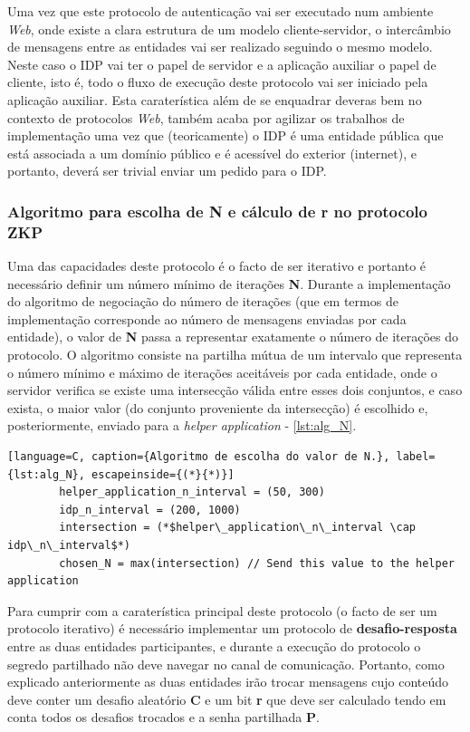 \quad Uma vez que este protocolo de autenticação vai ser executado num ambiente \textit{Web}, onde existe a clara estrutura de um modelo cliente-servidor, o intercâmbio de mensagens entre as entidades vai ser realizado seguindo o mesmo modelo. Neste caso o IDP vai ter o papel de servidor e a aplicação auxiliar o papel de cliente, isto é, todo o fluxo de execução deste protocolo vai ser iniciado pela aplicação auxiliar. Esta caraterística além de se enquadrar deveras bem no contexto de protocolos \textit{Web}, também acaba por agilizar os trabalhos de implementação uma vez que (teoricamente) o IDP é uma entidade pública que está associada a um domínio público e é acessível do exterior (internet), e portanto, deverá ser trivial enviar um pedido para o IDP. 

\subsubsection{Algoritmo para escolha de N e cálculo de r no protocolo ZKP}
\label{mat_zkp}

\quad Uma das capacidades deste protocolo é o facto de ser iterativo e portanto é necessário definir um número mínimo de iterações \textbf{N}. Durante a implementação do algoritmo de negociação do número de iterações (que em termos de implementação corresponde ao número de mensagens enviadas por cada entidade), o valor de \textbf{N} passa a representar exatamente o número de iterações do protocolo. O algoritmo consiste na partilha mútua de um intervalo que representa o número mínimo e máximo de iterações aceitáveis por cada entidade, onde o servidor verifica se existe uma intersecção válida entre esses dois conjuntos, e caso exista, o maior valor (do conjunto proveniente da intersecção) é escolhido e, posteriormente, enviado para a \textit{helper application} - \ref{lst:alg_N}.

\begin{minipage}{\linewidth}
    \begin{lstlisting}[language=C, caption={Algoritmo de escolha do valor de N.}, label={lst:alg_N}, escapeinside={(*}{*)}]
        helper_application_n_interval = (50, 300)
        idp_n_interval = (200, 1000)
        intersection = (*$helper\_application\_n\_interval \cap idp\_n\_interval$*)
        chosen_N = max(intersection) // Send this value to the helper application
    \end{lstlisting}
\end{minipage}

\quad Para cumprir com a caraterística principal deste protocolo (o facto de ser um protocolo iterativo) é necessário implementar um protocolo de \textbf{desafio-resposta} entre as duas entidades participantes, e durante a execução do protocolo o segredo partilhado não deve navegar no canal de comunicação. Portanto, como explicado anteriormente as duas entidades irão trocar mensagens cujo conteúdo deve conter um desafio aleatório \textbf{C} e um bit \textbf{r} que deve ser calculado tendo em conta todos os desafios trocados e a senha partilhada \textbf{P}.

